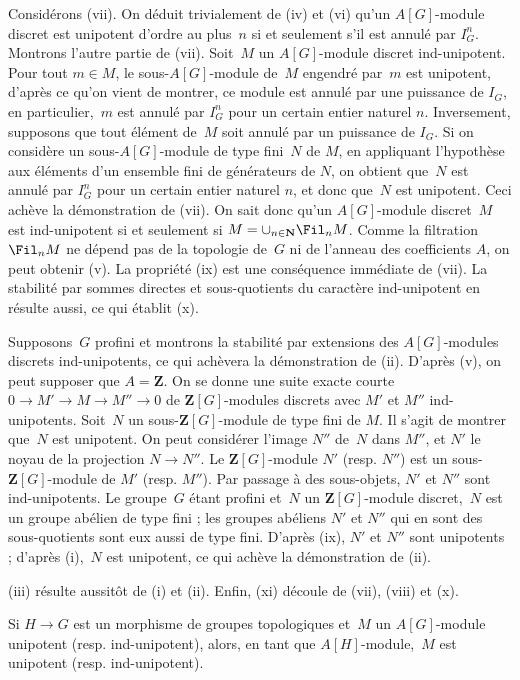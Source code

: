 \documentclass[10pt]{../fichiers-configuration-latex/smfart}
\begin{document}
Considérons (vii). On déduit trivialement de (iv) et (vi) qu'un
$A[G]$-module discret est unipotent d'ordre au plus $n$ si et seulement
s'il est annulé par $I_G^n$. Montrons l'autre partie de (vii). Soit $M$ un
$A[G]$-module discret ind-unipotent. Pour tout $m\in M$, le
sous-$A[G]$-module de $M$ engendré par $m$ est unipotent, d'après ce qu'on
vient de montrer, ce module est annulé par une puissance de $I_G$, en
particulier, $m$ est annulé par $I_G^n$ pour un certain entier naturel $n$.
Inversement, supposons que tout élément de $M$ soit annulé par un puissance
de $I_G$. Si on considère un sous-$A[G]$-module de type fini $N$ de $M$, en
appliquant l'hypothèse aux éléments d'un ensemble fini de générateurs de
$N$, on obtient que $N$ est annulé par $I_G^n$ pour un certain entier
naturel $n$, et donc que $N$ est unipotent. Ceci achève la démonstration de
(vii). On sait donc qu'un $A[G]$-module discret $M$ est ind-unipotent si et
seulement si $M=\cup_{n\in\mathbf{N}}\Fil_n M$. Comme la filtration $\Fil_n
M$ ne dépend pas de la topologie de $G$ ni de l'anneau des coefficients
$A$, on peut obtenir (v). La propriété (ix) est une conséquence immédiate
de (vii). La stabilité par sommes directes et sous-quotients du caractère
ind-unipotent en résulte aussi, ce qui établit (x).

Supposons $G$ profini
et montrons la stabilité par extensions des $A[G]$-modules discrets
ind-unipotents, ce qui achèvera la démonstration de (ii).
D'après (v), on peut supposer que $A=\mathbf{Z}$. On se
donne une suite exacte courte $0\to M'\to M\to M''\to 0$ de
$\mathbf{Z}[G]$-modules discrets avec $M'$ et $M''$ ind-unipotents.
Soit $N$ un sous-$\mathbf{Z}[G]$-module
de type fini de $M$. Il s'agit de montrer que $N$ est unipotent. On peut
considérer l'image $N''$ de $N$ dans $M''$, et $N'$ le noyau de la
projection $N\to N''$. Le $\mathbf{Z}[G]$-module $N'$ (resp. $N''$) est un
sous-$\mathbf{Z}[G]$-module de $M'$ (resp. $M''$). Par passage à des
sous-objets, $N'$ et $N''$ sont ind-unipotents. Le groupe $G$ étant profini
et $N$ un $\mathbf{Z}[G]$-module discret, $N$ est un groupe abélien de type
fini ; les groupes abéliens $N'$ et $N''$ qui en sont des sous-quotients
sont eux aussi de type fini. D'après (ix), $N'$ et $N''$ sont
unipotents ; d'après (i), $N$ est unipotent, ce qui achève la
démonstration de (ii).

(iii) résulte aussitôt de (i) et (ii). Enfin, (xi) découle de (vii), (viii)
et (x).

\begin{remarque2}
Si $H\to G$ est un morphisme de groupes topologiques et $M$ un
$A[G]$-module unipotent (resp. ind-unipotent), alors, en tant
que $A[H]$-module, $M$ est unipotent (resp. ind-unipotent).
\end{remarque2}
\end{document}
